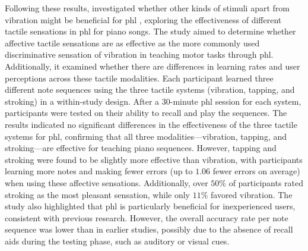 Following these results, \cite{Fang2023} investigated whether other kinds of stimuli apart from vibration might be beneficial for \gls{phl} , exploring the effectiveness of different tactile sensations in \gls{phl} for piano songs. The study aimed to determine whether affective tactile sensations are as effective as the more commonly used discriminative sensation of vibration in teaching motor tasks through \gls{phl}. Additionally, it examined whether there are differences in learning rates and user perceptions across these tactile modalities. Each participant learned three different note sequences using the three tactile systems (vibration, tapping, and stroking) in a within-study design. After a 30-minute \gls{phl} session for each system, participants were tested on their ability to recall and play the sequences. The results indicated no significant differences in the effectiveness of the three tactile systems for \gls{phl}, confirming that all three modalities—vibration, tapping, and stroking—are effective for teaching piano sequences. However, tapping and stroking were found to be slightly more effective than vibration, with participants learning more notes and making fewer errors (up to $1.06$ fewer errors on average) when using these affective sensations. Additionally, over $50\%$ of participants rated stroking as the most pleasant sensation, while only $11\%$ favored vibration. The study also highlighted that \gls{phl} is particularly beneficial for inexperienced users, consistent with previous research. However, the overall accuracy rate per note sequence was lower than in earlier studies, possibly due to the absence of recall aids during the testing phase, such as auditory or visual cues.

